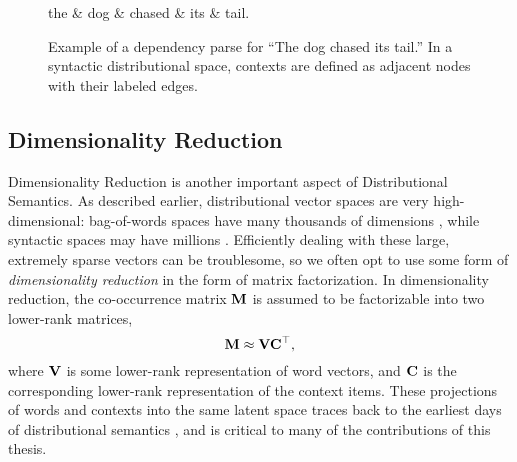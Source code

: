 \begin{figure}
\centering
\begin{dependency}[edge vertical padding=0.5ex, edge style={black},
                   label style={fill=black,text=white,font=\ttfamily}]
  \begin{deptext}[column sep=0.7cm,nodes={font=\Large}]
    the \& dog \& chased \& its \& tail.\\
  \end{deptext}
\end{dependency}
\caption{Example of a dependency parse for ``The dog chased its tail.'' In
a syntactic distributional space, contexts are defined as adjacent nodes
with their labeled edges.}
\label{fig:syn}
\end{figure}

\subsection{Dimensionality Reduction}
Dimensionality Reduction is another important aspect of Distributional Semantics.
As described earlier, distributional vector
spaces are very high-dimensional: bag-of-words spaces have many thousands of
dimensions \cite{turney:2010:jair,mikolov:2013:iclr,pennington:2014:emnlp},
while syntactic spaces may have millions \cite{baroni:2010:cl,pado:2007:cl}.
Efficiently dealing with these large, extremely sparse vectors can be
troublesome, so we often opt to use some form of {\em dimensionality reduction}
in the form of matrix factorization.  In dimensionality reduction, the
co-occurrence matrix ${{\mathbf{M}}}$ is assumed to be factorizable into two lower-rank
matrices,
\begin{equation}
  {\bf M} \approx {{\mathbf{V}}}{{\mathbf{C}}}^{\top},
  \label{eqn:factorization}
\end{equation}
where ${{\mathbf{V}}}$ is some lower-rank representation of word vectors, and ${{\mathbf{C}}}$ is
the corresponding lower-rank representation of the context items. These
projections of words and contexts into the same latent space traces back to the
earliest days of distributional semantics
\cite{landauer:1997:pr,deerwester:1990:jsis}, and is critical to many of the
contributions of this thesis.

